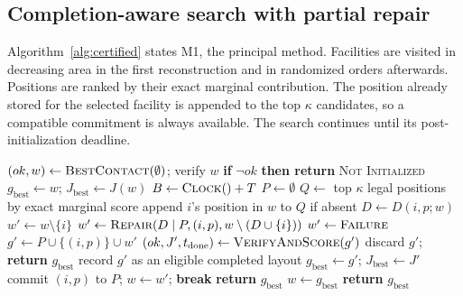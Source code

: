 \documentclass[preprint,12pt,authoryear]{elsarticle}
\begin{document}
\subsection{Completion-aware search with partial repair}
Algorithm~\ref{alg:certified} states M1, the principal method. Facilities are
visited in decreasing area in the first reconstruction and in randomized orders
afterwards. Positions are ranked by their exact marginal contribution. The
position already stored for the selected facility is appended to the top
$\kappa$ candidates, so a compatible commitment is always available. The search
continues until its post-initialization deadline.

\begin{algorithm}[H]
\caption{Completion-aware search with partial witness repair (M1).}
\label{alg:certified}
\footnotesize
\begin{algorithmic}[1]
\State $(ok,w)\gets\textsc{BestContact}(\emptyset)$; verify $w$
\State \textbf{if} $\lnot ok$ \textbf{then return} \textsc{Not Initialized}
\State $g_{\mathrm{best}}\gets w$; $J_{\mathrm{best}}\gets J(w)$
\State $B\gets\textsc{Clock}()+T$ 
  \State $P\gets\emptyset$ 
    \State $Q\gets$ top $\kappa$ legal positions by exact marginal score
    \State append $i$'s position in $w$ to $Q$ if absent
      \State $D\gets D(i,p;w)$
        \State $w'\gets w\setminus\{i\}$ 
        \State $w'\gets\textsc{Repair}(D\mid P,(i,p),w\setminus(D\cup\{i\}))$
      \Else
        \State $w'\gets\textsc{Failure}$
      \EndIf
        \State $g'\gets P\cup\{(i,p)\}\cup w'$
        \State $(ok,J',t_{\mathrm{done}})\gets\textsc{VerifyAndScore}(g')$
          \State discard $g'$; \textbf{return} $g_{\mathrm{best}}$
        \EndIf
          \State record $g'$ as an eligible completed layout
            \State $g_{\mathrm{best}}\gets g'$; $J_{\mathrm{best}}\gets J'$
          \EndIf
        \State commit $(i,p)$ to $P$; $w\gets w'$; \textbf{break}
        \EndIf
      \EndIf
    \EndFor
     \State \textbf{return} $g_{\mathrm{best}}$ \EndIf
  \EndFor
  \State $w\gets g_{\mathrm{best}}$ 
\EndWhile
\State \textbf{return} $g_{\mathrm{best}}$
\end{algorithmic}
\end{algorithm}
\end{document}
